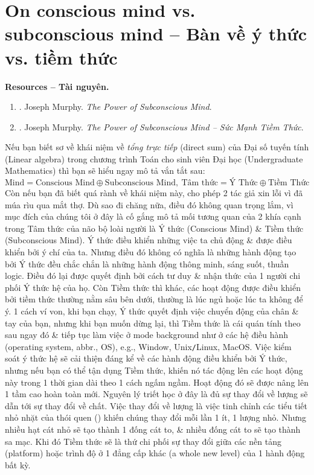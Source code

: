 \documentclass[12pt,oneside]{book}
\begin{document}
\section{On conscious mind vs. subconscious mind -- Bàn về ý thức vs. tiềm thức}
{\bf \textsf{Resources -- Tài nguyên.}}
\begin{enumerate}
	\item \cite{Murphy_subconscious}. {\sc Joseph Murphy}. {\it The Power of Subconscious Mind}.
	\item \cite{Murphy_subconscious_VN}. {\sc Joseph Murphy}. {\it The Power of Subconscious Mind -- Sức Mạnh Tiềm Thức}.
\end{enumerate}
Nếu bạn biết sơ về khái niệm về {\it tổng trực tiếp} (direct sum) của Đại số tuyến tính (Linear algebra) trong chương trình Toán cho sinh viên Đại học (Undergraduate Mathematics) thì bạn sẽ hiểu ngay mô tả vắn tắt sau:
\begin{equation}
	\label{conscious + subconscious}
	\tag{mind}
	\boxed{\mbox{Mind} = \mbox{Conscious Mind}\oplus\mbox{Subconscious Mind},\ \mbox{Tâm thức} = \mbox{Ý Thức}\oplus\mbox{Tiềm Thức}}
\end{equation}
Còn nếu bạn đã biết quá rành về khái niệm này, cho phép 2 tác giả xin lỗi vì đã múa rìu qua mắt thợ. Dù sao đi chăng nữa, điều đó không quan trọng lắm, vì mục đích của chúng tôi ở đây là cố gắng mô tả mối tương quan của 2 khía cạnh trong Tâm thức của não bộ loài người là Ý thức (Conscious Mind) \& Tiềm thức (Subconscious Mind). Ý thức điều khiển những việc ta chủ động \& được điều khiển bởi ý chí của ta. Nhưng điều đó không có nghĩa là những hành động tạo bởi Ý thức đều chắc chắn là những hành động thông minh, sáng suốt, thuần logic. Điều đó lại được quyết định bởi cách tư duy \& nhận thức của 1 người chi phối Ý thức hệ của họ. Còn Tiềm thức thì khác, các hoạt động được điều khiển bởi tiềm thức thường nằm sâu bên dưới, thường là lúc ngủ hoặc lúc ta không để ý. 1 cách ví von, khi bạn chạy, Ý thức quyết định việc chuyển động của chân \& tay của bạn, nhưng khi bạn muốn dừng lại, thì Tiềm thức là cái quán tính theo sau ngay đó \& tiếp tục làm việc ở mode background như ở các hệ điều hành (operating system, abbr., OS), e.g., Window, Unix{\tt/}Linux, MacOS. Việc kiểm soát ý thức hệ sẽ cải thiện đáng kể về các hành động điều khiển bởi Ý thức, nhưng nếu bạn có thể tận dụng Tiềm thức, khiến nó tác động lên các hoạt động này trong 1 thời gian dài theo 1 cách ngấm ngầm. Hoạt động đó sẽ được nâng lên 1 tầm cao hoàn toàn mới. Nguyên lý triết học ở đây là đủ sự thay đổi về lượng sẽ dẫn tới sự thay đổi về chất. Việc thay đổi về lượng là việc tinh chỉnh các tiểu tiết nhỏ nhặt của thói quen (\cite{Clear_habit,Clear_habit_VN,Duhigg_habit,Duhigg_habit_VN}) khiến chúng thay đổi mỗi lần 1 ít, 1 lượng nhỏ. Nhưng nhiều hạt cát nhỏ sẽ tạo thành 1 đống cát to, \& nhiều đống cát to sẽ tạo thành sa mạc. Khi đó Tiềm thức sẽ là thứ chi phối sự thay đổi giữa các nền tảng (platform) hoặc trình độ ở 1 đẳng cấp khác (a whole new level) của 1 hành động bất kỳ.
\end{document}
